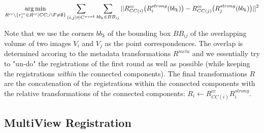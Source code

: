 \begin{equation}
\label{eq:globalopt-eq4}
\operatorname*{arg\,min}_{R^{cc} \setminus \{ r^{cc}_{i} \in R^{cc} | CC_i \cap F \neq \emptyset \}} \sum_{(i,j) \in C^{weak}} \sum_{bb_{k} \in BB_{ij}} || R^{cc}_{CC(i)}\big( R^{strong}_{i}( bb_{k})\big) -  R^{cc}_{CC(j)}\big( R^{strong}_{j}( bb_{k}) \big) ||^2 
\end{equation}

Note that we use the corners $bb_k$ of the bounding box $BB_{ij}$ of the overlapping volume of two images $V_i$ and $V_j$ as the point correspondences. The overlap is determined accoring to the metadata transformations $R^{meta}$ and we essentially try to "un-do" the registrations of the first round as well as possible (while keeping the registrations \emph{within} the connected components). The final transformations $R$ are the concatenation of the registrations within the connected components with the relative transformations of the connected components: $R_{i} \leftarrow R^{cc}_{CC(i)} R^{strong}_{i}$.


\subsection{MultiView Registration}



\pagebreak







